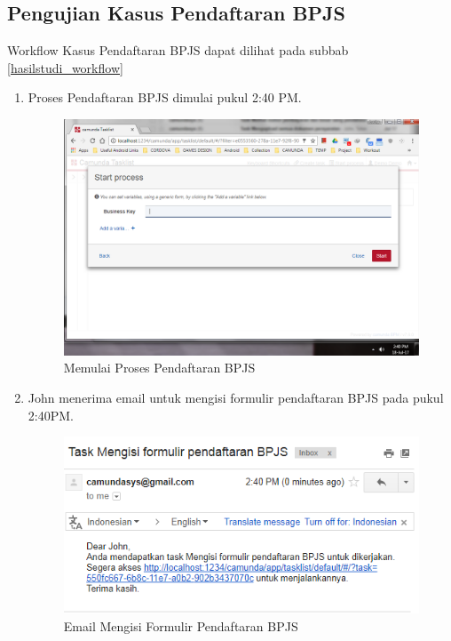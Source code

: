 \subsection{Pengujian Kasus Pendaftaran BPJS}
\label{pengujian_kasus2}
Workflow Kasus Pendaftaran BPJS dapat dilihat pada subbab \ref{hasilstudi_workflow}
\begin{enumerate}
	\item Proses Pendaftaran BPJS dimulai pukul 2:40 PM.
			\begin{figure}[H]
			\centering
			\includegraphics[scale=0.5]{Gambar/Bab-5/kasus2/1}
			\caption{Memulai Proses Pendaftaran BPJS} 
			\label{fig:pengujian_kasus2_1}
	\end{figure}
	

	\item John menerima email untuk mengisi formulir pendaftaran BPJS pada pukul 2:40PM.
			\begin{figure}[H]
			\centering
			\includegraphics[scale=0.8]{Gambar/Bab-5/kasus2/2}
			\caption{Email Mengisi Formulir Pendaftaran BPJS} 
			\label{fig:pengujian_kasus2_2}
	\end{figure}
	


\end{enumerate}
